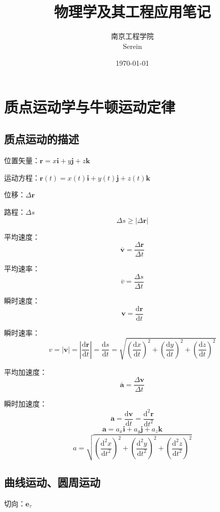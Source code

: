 \documentclass[12pt, a4paper, twoside]{ctexbook}
\title{{\Huge{\textbf{物理学及其工程应用笔记}}}}
\author{南京工程学院\\Serein}
\date{\today}
\begin{document}
\maketitle


\newpage
{} 
\setcounter{page}{1}
\tableofcontents
\newpage
\setcounter{page}{1}

\chapter{质点运动学与牛顿运动定律}
\newpage
\section{质点运动的描述}
{\sonti 位置矢量}：$\boldsymbol{r}=x\boldsymbol{i}+y\boldsymbol{j}+z\boldsymbol{k}$

{\sonti 运动方程}：$\boldsymbol{r}\left(t\right)=x\left(t\right)\boldsymbol{i}+y\left(t\right)\boldsymbol{j}+z\left(t\right)\boldsymbol{k}$

{\sonti 位移}：$\Delta \boldsymbol{r}$

{\sonti 路程}：$\Delta s$
$$
\Delta s \geqslant \left|\Delta \boldsymbol{r}\right|
$$

{\sonti 平均速度}：
$$
\overline{\boldsymbol{v}}=\frac{\Delta \boldsymbol{r}}{\Delta t}
$$

{\sonti 平均速率}：
$$
\overline{v}=\frac{\Delta s}{\Delta t}
$$

{\sonti 瞬时速度}：
$$
\boldsymbol{v}=\frac{\mathrm{d}\boldsymbol{r}}{\mathrm{d}t}
$$

{\sonti 瞬时速率}：
$$
v=\left|\boldsymbol{v}\right|=\left|\frac{\mathrm{d}\boldsymbol{r}}{\mathrm{d}t}\right|=\frac{\mathrm{d}s}{\mathrm{d}t}=\sqrt{\left(\frac{\mathrm{d}x}{\mathrm{d}t}\right)^2+\left(\frac{\mathrm{d}y}{\mathrm{d}t}\right)^2+\left(\frac{\mathrm{d}z}{\mathrm{d}t}\right)^2}
$$

{\sonti 平均加速度}：
$$
\overline{\boldsymbol{a}}=\frac{\Delta \boldsymbol{v}}{\Delta t}
$$

{\sonti 瞬时加速度}：
$$
\boldsymbol{a}=\frac{\mathrm{d}\boldsymbol{v}}{\mathrm{d}t}= \frac{\mathrm{d}^2\boldsymbol{r}}{\mathrm{d}t^2}
$$
$$
\boldsymbol{a}=a_x\boldsymbol{i}+a_y\boldsymbol{j}+a_z\boldsymbol{k}
$$
$$
a=\sqrt{\left(\frac{\mathrm{d}^2x}{\mathrm{d}t^2}\right)^2+\left(\frac{\mathrm{d}^2y}{\mathrm{d}t^2}\right)^2+\left(\frac{\mathrm{d}^2z}{\mathrm{d}t^2}\right)^2}
$$
\section{曲线运动、圆周运动}
{\sonti 切向}：$\boldsymbol{e}_\tau$
\end{document}
